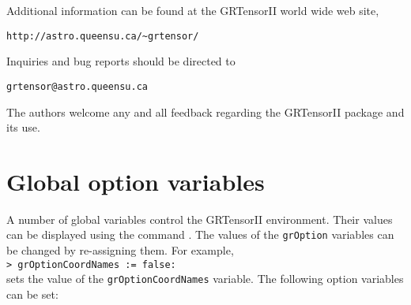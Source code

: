 \documentclass{article}
\begin{document}
\noindent Additional information can be found at the GRTensorII world wide web
site,
\begin{center}
  \texttt{http://astro.queensu.ca/\~{}grtensor/}
\end{center}
Inquiries and bug reports should be directed to
\begin{center}
  \makeatletter
  \texttt{grtensor@astro.queensu.ca}
  \makeatother
\end{center}
The authors welcome any and all feedback regarding the GRTensorII package
and its use.
%
\section{Global option variables} \label{sec:groptions}
%
A number of global variables control the GRTensorII environment. Their
values can be displayed using the command
\label{spec:groptions}. The values of the
\texttt{grOption} variables can be changed by re-assigning them. For
example,\\

\noindent\texttt{> grOptionCoordNames := false:}\\

\noindent sets the value of the \texttt{grOptionCoordNames} variable.
The following option variables can be set:
\end{document}
